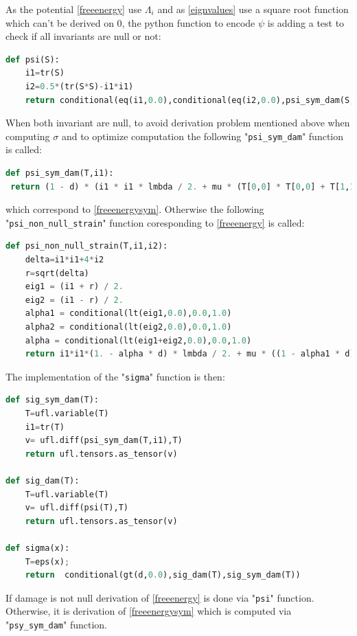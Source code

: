 \documentclass[12pt]{article}
\newcommand{\tens}[1]{
	{\ensuremath{\mathsf{#1}}}
}
\newcommand{\mycodepy}[1]{\textsf{"}\lstinline[language=Python]`#1`\textsf{"}}
\begin{document}
As the potential \eqref{freeenergy} use $\Lambda_i$ and as \eqref{eignvalues} use a square root function which can't be derived on 0, the python function to encode $\psi$ is adding a test to check if all invariants are null or not:
\begin{lstlisting}[numbers=none,basicstyle=\footnotesize,language=python]
def psi(S):
	i1=tr(S)
	i2=0.5*(tr(S*S)-i1*i1)
	return conditional(eq(i1,0.0),conditional(eq(i2,0.0),psi_sym_dam(S,i1),psi_non_null_strain(S,i1,i2)),psi_non_null_strain(S,i1,i2))
\end{lstlisting} 
When both invariant are null, to avoid derivation problem mentioned above when computing $\tens{\sigma}$ and to optimize computation the following \mycodepy{psi_sym_dam}  function is called:
\begin{lstlisting}[numbers=none,basicstyle=\footnotesize,language=python]
def psi_sym_dam(T,i1):
 return (1 - d) * (i1 * i1 * lmbda / 2. + mu * (T[0,0] * T[0,0] + T[1,1] * T[1,1] + T[1,0] * T[1,0] + T[0,1] * T[0,1]))

\end{lstlisting} 
which correspond to \eqref{freeenergysym}. Otherwise the following \mycodepy{psi_non_null_strain} function coresponding to \eqref{freeenergy} is called:
\begin{lstlisting}[numbers=none,basicstyle=\footnotesize,language=python]
def psi_non_null_strain(T,i1,i2):
	delta=i1*i1+4*i2
	r=sqrt(delta)
	eig1 = (i1 + r) / 2.
	eig2 = (i1 - r) / 2.
	alpha1 = conditional(lt(eig1,0.0),0.0,1.0)
	alpha2 = conditional(lt(eig2,0.0),0.0,1.0)
	alpha = conditional(lt(eig1+eig2,0.0),0.0,1.0)
	return i1*i1*(1. - alpha * d) * lmbda / 2. + mu * ((1 - alpha1 * d) * eig1 * eig1 + (1. - alpha2 * d) * eig2 * eig2)
\end{lstlisting}
The implementation of the \mycodepy{sigma} function is then:
\begin{lstlisting}[numbers=none,basicstyle=\footnotesize,language=python]
def sig_sym_dam(T): 
	T=ufl.variable(T)
	i1=tr(T)
	v= ufl.diff(psi_sym_dam(T,i1),T)
	return ufl.tensors.as_tensor(v)

def sig_dam(T): 
	T=ufl.variable(T)
	v= ufl.diff(psi(T),T)
	return ufl.tensors.as_tensor(v)

def sigma(x): 
	T=eps(x);
	return  conditional(gt(d,0.0),sig_dam(T),sig_sym_dam(T))
\end{lstlisting} 	
If damage is not null derivation of \eqref{freeenergy} is done via \mycodepy{psi} function. Otherwise, it is derivation of \eqref{freeenergysym} which is computed via \mycodepy{psy_sym_dam} function.
\end{document}
